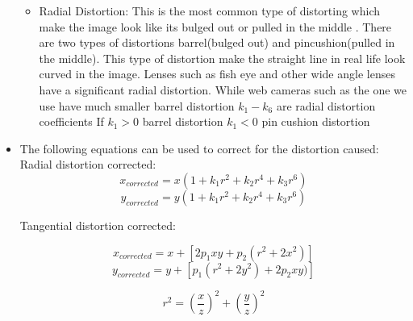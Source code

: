 \begin{itemize}
\begin{itemize}
                            \item Radial Distortion: This is the most common type of distorting which make the image look like its bulged out or pulled in the middle . There are two types of distortions barrel(bulged out) and pincushion(pulled in the middle).
                            This type of distortion make the straight line in real life look curved in the image. Lenses such as fish eye and other wide angle lenses have a significant radial distortion. While web cameras such as the one we use have much smaller barrel distortion
                             $k_1-k_6$ are radial distortion coefficients
                             If 
                             $k_1>0$ barrel distortion 
                             $k_1<0$ pin cushion distortion
                              
                        \end{itemize}
                        
                        
                        
                \item The following equations can be used to correct for the distortion caused:
                        \newline
                         Radial distortion corrected:
                         $$x_{corrected}=x(1+k_1r^2+k_2r^4+k_3r^6)$$
                         $$y_{corrected}=y(1+k_1r^2+k_2r^4+k_3r^6)$$
                         
                         Tangential distortion corrected:
                         
                         $$x_{corrected}=x+[2p_1xy+p_2(r^2+2x^2)]$$
                         $$y_{corrected}=y+[p_1(r^2+2y^2)+2p_2xy)]$$
                         
                         $$r^2=(\frac{x}{z})^2+(\frac{y}{z})^2$$
                         

\end{itemize}
